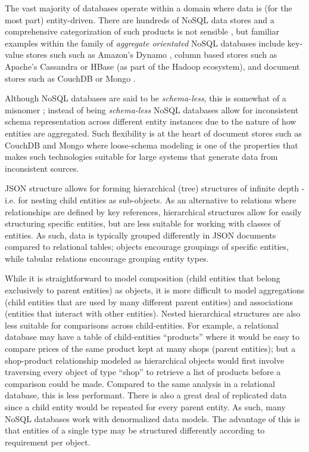 The vast majority of databases operate within a domain where data is (for the most part) entity-driven. There are hundreds of NoSQL data stores and a comprehensive categorization of such products is not sensible \cite{GANESHCHANDRA201513}, but familiar examples within the family of \textit{aggregate orientated} NoSQL databases include key-value stores such such as Amazon's Dynamo \cite{sadalage2012}, column based stores such as Apache's Cassandra \cite{sadalage2012} or HBase \cite{sadalage2012} (as part of the Hadoop ecosystem), and document stores such as CouchDB or Mongo \cite{sadalage2012}.

Although NoSQL databases are said to be \textit{schema-less}, this is somewhat of a misnomer \cite{ATZENI2016}; instead of being \textit{schema-less} NoSQL databases allow for inconsistent schema representation across different entity instances due to the nature of how entities are aggregated. Such flexibility is at the heart of document stores such as CouchDB and Mongo where loose-schema modeling is one of the properties that makes such technologies suitable for large systems that generate data from inconsistent sources.

JSON structure allows for forming hierarchical (tree) structures of infinite depth - i.e. for nesting child entities as sub-objects. As an alternative to relations where relationships are defined by key references, hierarchical structures allow for easily structuring specific entities, but are less suitable for working with classes of entities. As such, data is typically grouped differently in JSON documents compared to relational tables; objects encourage groupings of specific entities, while tabular relations encourage grouping entity types.

While it is straightforward to model composition (child entities that belong exclusively to parent entities) as objects, it is more difficult to model aggregations (child entities that are used by many different parent entities) and associations (entities that interact with other entities). Nested hierarchical structures are also less suitable for comparisons across child-entities. For example, a relational database may have a table of child-entities ``products'' where it would be easy to compare prices of the same product kept at many shops (parent entities); but a shop-product relationship modeled as hierarchical objects would first involve traversing every object of type ``shop'' to retrieve a list of products before a comparison could be made. Compared to the same analysis in a relational database, this is less performant. There is also a great deal of replicated data since a child entity would be repeated for every parent entity. As such, many NoSQL databases work with denormalized data models. The advantage of this is that entities of a single type may be structured differently according to requirement per object.

